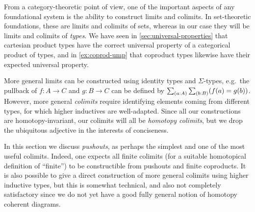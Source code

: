 From a category-theoretic point of view, one of the important aspects of any foundational system is the ability to construct limits and colimits.
In set-theoretic foundations, these are limits and colimits of sets, whereas in our case they will be limits and colimits of \emph{types}.
We have seen in \autoref{sec:universal-properties} that cartesian product types have the correct universal property of a categorical product of types, and in \autoref{ex:coprod-ump} that coproduct types likewise have their expected universal property.

More general limits can be constructed using identity types and $\Sigma$-types, e.g.\ the pullback of $f:A\to C$ and $g:B\to C$ can be defined by $\sm{a:A}{b:B} (f(a)=g(b))$.
However, more general \emph{colimits} require identifying elements coming from different types, for which higher inductives are well-adapted.
Since all our constructions are homotopy-invariant, our colimits will all be \emph{homotopy colimits}, but we drop the ubiquitous adjective in the interests of conciseness.

In this section we discuss \emph{pushouts}, as perhaps the simplest and one of the most useful colimits.
Indeed, one expects all finite colimits (for a suitable homotopical definition of ``finite'') to be constructible from pushouts and finite coproducts.
It is also possible to give a direct construction of more general colimits using higher inductive types, but this is somewhat technical, and also not completely satisfactory since we do not yet have a good fully general notion of homotopy coherent diagrams.

